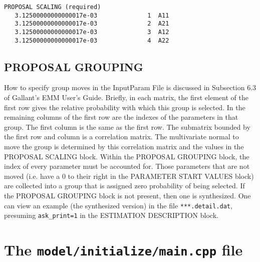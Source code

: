 \documentclass[11pt, letterpaper, notitlepage]{article}
\begin{document}
\begin{verbatim}
PROPOSAL SCALING (required)
   3.12500000000000017e-03              1  A11
   3.12500000000000017e-03              2  A21
   3.12500000000000017e-03              3  A12
   3.12500000000000017e-03              4  A22
\end{verbatim}

\subsection{PROPOSAL GROUPING}


How to specify group moves in the InputParam File is discussed in Subsection $6.3$ of Gallant's EMM User's Guide. Briefly, in each matrix, the first element of the first row gives the relative probability with which this group is selected. In the remaining columns of the first row are the indexes of the parameters in that group. The first column is the same as the first row. The submatrix bounded by the first row and column is a correlation matrix. The multivariate normal to move the group is determined by this correlation matrix and the values in the PROPOSAL SCALING block. Within the PROPOSAL GROUPING block, the index of every parameter must be accounted for. Those parameters that are not moved (i.e. have a $0$ to their right in the PARAMETER START VALUES
block) are collected into a group that is assigned zero probability of being selected. If the PROPOSAL GROUPING block is not present, then one is synthesized. One can view an example (the synthesized version) in the
file \texttt{***.detail.dat}, presuming \texttt{ask\_print=1} in the ESTIMATION DESCRIPTION block.

\pagebreak

\section*{The \texttt{model/initialize/main.cpp} file }
\end{document}
